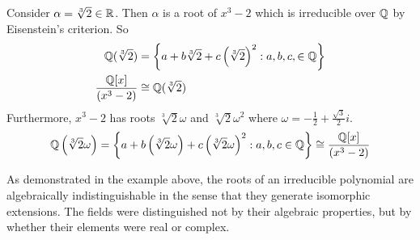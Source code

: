 \begin{example}
    Consider $\alpha = \sqrt[3]{2}\in \mathbb{R}$. Then $\alpha$ is a root of $x^3-2$ which is irreducible over $\mathbb{Q}$ by Eisenstein's criterion. So
    \begin{align*}
        \mathbb{Q}(\sqrt[3]{2}) &= \left\{a+b\sqrt[3]{2} + c\left(\sqrt[3]{2}\right)^2 : a, b, c, \in \mathbb{Q}\right\} \\
        \frac{\mathbb{Q}[x]}{(x^3-2)} &\cong \mathbb{Q}(\sqrt[3]{2})
    \end{align*}
    Furthermore, $x^3-2$ has roots $\sqrt[3]{2}\omega$ and $\sqrt[3]{2}\omega^2$ where $\omega = -\frac{1}{2} + \frac{\sqrt{3}}{2}i.$
    $$\mathbb{Q}\left(\sqrt[3]{2}\omega\right) = \left\{a+b\left(\sqrt[3]{2}\omega\right) + c\left(\sqrt[3]{2}\omega\right)^2 : a,b,c \in \mathbb{Q}\right\} \cong \frac{\mathbb{Q}[x]}{(x^3 - 2)}$$
\end{example}

As demonstrated in the example above, the roots of an irreducible polynomial are algebraically indistinguishable in the sense that they generate isomorphic extensions. The fields were distinguished not by their algebraic properties, but by whether their elements were real or complex.